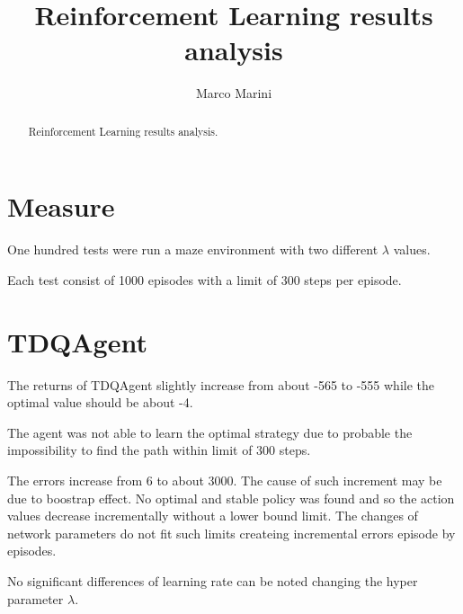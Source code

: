 \documentclass[a4paper,11pt]{article}
\title{Reinforcement Learning results analysis}
\author{Marco Marini}
\begin{document}
\maketitle
\tableofcontents

\begin{abstract}
Reinforcement Learning results analysis.
\end{abstract}

\section{Measure}

One hundred tests were run a maze environment with two different $\lambda$ values.

Each test consist of 1000 episodes with a limit of 300 steps per episode.

\section{TDQAgent}

The returns of TDQAgent slightly increase from about -565 to -555 while the optimal value should be about -4.

The agent was not able to learn the optimal strategy due to probable the impossibility to find the path within limit of 300 steps.

The errors increase from 6 to about 3000. The cause of such increment may be due to boostrap effect.
No optimal and stable policy was found and so the action values decrease incrementally without a lower bound limit.
The changes of network parameters do not fit such limits createing incremental errors episode by episodes.

No significant differences of learning rate can be noted changing the hyper parameter $\lambda$.
\end{document}
